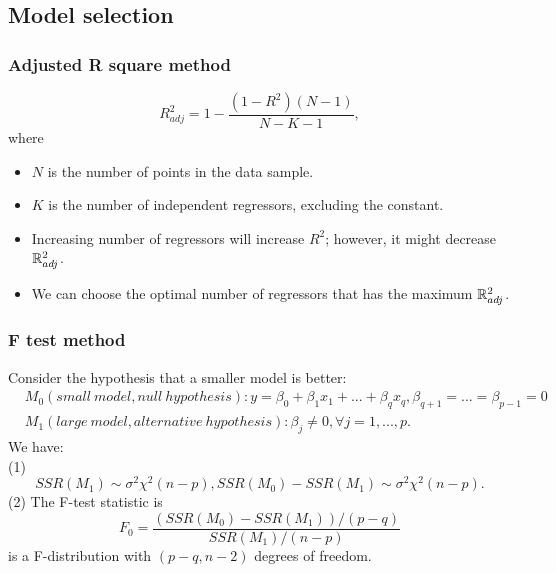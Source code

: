 \begin{refsection}
\subsection{Model selection}

\subsubsection{Adjusted R square method}
\begin{definition}
	
	$$R^2_{adj} = 1 - \frac{(1-R^2)(N-1)}{N-K-1},$$
where \begin{itemize}
	\item $N$ is the number of points in the data sample.
	\item $K$ is the number of independent regressors, excluding the constant.
\end{itemize}	
\end{definition}


\begin{remark}[interpretation]\hfill
\begin{itemize}
	\item Increasing number of regressors will increase $R^2$; however, it might decrease $\mathbb{R}^2_{adj}$.
	\item We can choose the optimal number of regressors that has the maximum $\mathbb{R}_{adj}^2$.
\end{itemize}	
\end{remark}

\subsubsection{F test method}
\begin{theorem}
	Consider the hypothesis that a smaller model is better: 
	\begin{align*}
	&M_0(small~model, null~hypothesis): y = \beta_0 + \beta_1x_1 + ... + \beta_{q}x_q, \beta_{q+1} = ... = \beta_{p-1} = 0\\
	&M_1(large~model, alternative~hypothesis): \beta_j \neq 0,\forall j=1,...,p.
	\end{align*}
	We have:\\
	(1)  $$SSR(M_1)\sim \sigma^2\chi^2(n-p),SSR(M_0) - SSR(M_1) \sim \sigma^2\chi^2(n-p).$$
	(2)
	The F-test statistic is
	$$F_0 = \frac{(SSR(M_0)-SSR(M_1))/(p-q)}{SSR(M_1)/(n-p)}$$
	is a F-distribution with $(p-q,n-2)$ degrees of freedom.\\


\end{theorem}
\end{refsection}
